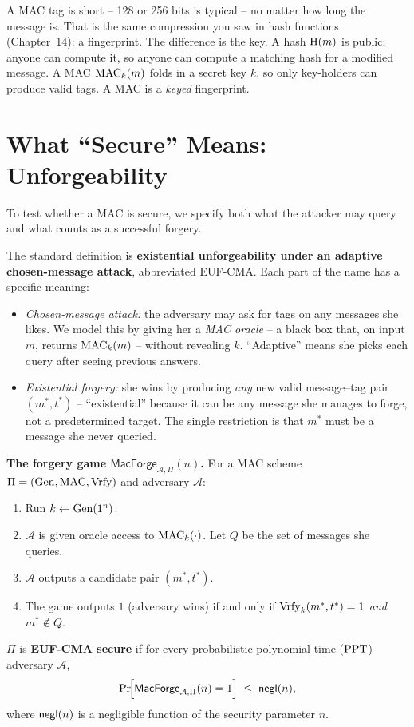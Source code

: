 \begin{focusbox}
A MAC tag is short -- 128 or 256 bits is typical -- no matter how long the message is. That is the same compression you saw in hash functions (Chapter~14): a fingerprint. The difference is the key. A hash $\operatorname{H}(m)$ is public; anyone can compute it, so anyone can compute a matching hash for a modified message. A MAC $\operatorname{MAC}_k(m)$ folds in a secret key $k$, so only key-holders can produce valid tags. A MAC is a \emph{keyed} fingerprint.
\end{focusbox}

\section{What ``Secure'' Means: Unforgeability}
\label{ch15:unforgeability}

To test whether a MAC is secure, we specify both what the attacker may query and what counts as a successful forgery.

The standard definition is \textbf{existential unforgeability under an adaptive chosen-message attack}, abbreviated EUF-CMA. Each part of the name has a specific meaning:
\begin{itemize}
  \item \emph{Chosen-message attack:} the adversary may ask for tags on any messages she likes. We model this by giving her a \emph{MAC oracle} -- a black box that, on input $m$, returns $\operatorname{MAC}_k(m)$ -- without revealing $k$. ``Adaptive'' means she picks each query after seeing previous answers.
  \item \emph{Existential forgery:} she wins by producing \emph{any} new valid message--tag pair $(m^*,t^*)$ -- ``existential'' because it can be any message she manages to forge, not a predetermined target. The single restriction is that $m^*$ must be a message she never queried.
\end{itemize}

\begin{formalbox}
\textbf{The forgery game $\mathsf{MacForge}_{\mathcal{A},\Pi}(n)$.} For a MAC scheme $\Pi=(\operatorname{Gen},\operatorname{MAC},\operatorname{Vrfy})$ and adversary $\mathcal{A}$:
\begin{enumerate}
  \item Run $k\gets\operatorname{Gen}(1^n)$.
  \item $\mathcal{A}$ is given oracle access to $\operatorname{MAC}_k(\cdot)$. Let $Q$ be the set of messages she queries.
  \item $\mathcal{A}$ outputs a candidate pair $(m^*,t^*)$.
  \item The game outputs $1$ (adversary wins) if and only if $\operatorname{Vrfy}_k(m^*,t^*)=1$ \emph{and} $m^*\notin Q$.
\end{enumerate}
$\Pi$ is \textbf{EUF-CMA secure} if for every probabilistic polynomial-time ($\mathrm{PPT}$) adversary $\mathcal{A}$,
\[
  \Pr\!\Bigl[\mathsf{MacForge}_{\mathcal{A},\Pi}(n)=1\Bigr] \;\le\; \mathsf{negl}(n),
\]
where $\mathsf{negl}(n)$ is a negligible function of the security parameter $n$.
\end{formalbox}

